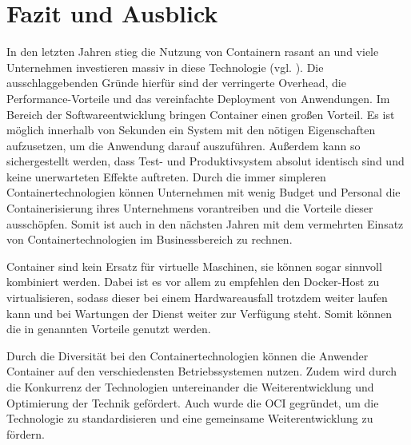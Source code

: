 \section{Fazit und Ausblick} 
\label{sec:Fazit}
In den letzten Jahren stieg die Nutzung von Containern rasant an und viele Unternehmen investieren massiv in diese Technologie (vgl. ). Die ausschlaggebenden Gründe hierfür sind der verringerte Overhead, die Performance-Vorteile und das vereinfachte Deployment von Anwendungen. Im Bereich der Softwareentwicklung bringen Container einen großen Vorteil. Es ist möglich innerhalb von Sekunden ein System mit den nötigen Eigenschaften aufzusetzen, um die Anwendung darauf auszuführen. Außerdem kann so sichergestellt werden, dass Test- und Produktivsystem absolut identisch sind und keine unerwarteten Effekte auftreten. Durch die immer simpleren Containertechnologien können Unternehmen mit wenig Budget und Personal die Containerisierung ihres Unternehmens vorantreiben und die Vorteile dieser ausschöpfen. Somit ist auch in den nächsten Jahren mit dem vermehrten Einsatz von Containertechnologien im Businessbereich zu rechnen. 

Container sind kein Ersatz für virtuelle Maschinen, sie können sogar sinnvoll kombiniert werden. Dabei ist es vor allem zu empfehlen den Docker-Host zu virtualisieren, sodass dieser bei einem Hardwareausfall trotzdem weiter laufen kann und bei Wartungen der Dienst weiter zur Verfügung steht. Somit können die in  genannten Vorteile genutzt werden.

Durch die Diversität bei den Containertechnologien können die Anwender Container auf den verschiedensten Betriebssystemen nutzen. Zudem wird durch die Konkurrenz der Technologien untereinander die Weiterentwicklung und Optimierung der Technik gefördert. Auch wurde die \ac{OCI} gegründet, um die Technologie zu standardisieren und eine gemeinsame Weiterentwicklung zu fördern.

